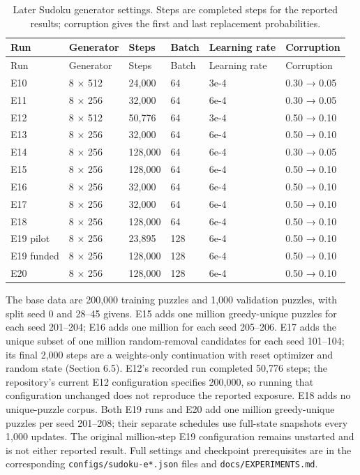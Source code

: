 \documentclass[
  british,
]{article}
\begin{document}
\begin{longtable}[]{@{}llllll@{}}
\caption{Later Sudoku generator settings. Steps are completed steps for
the reported results; corruption gives the first and last replacement
probabilities.}\tabularnewline
\toprule\noalign{}
Run & Generator & Steps & Batch & Learning rate & Corruption \\
\midrule\noalign{}
\endfirsthead
\toprule\noalign{}
Run & Generator & Steps & Batch & Learning rate & Corruption \\
\midrule\noalign{}
\endhead
\bottomrule\noalign{}
\endlastfoot
E10 & 8 × 512 & 24,000 & 64 & 3e-4 & 0.30 → 0.05 \\
E11 & 8 × 256 & 32,000 & 64 & 6e-4 & 0.30 → 0.05 \\
E12 & 8 × 512 & 50,776 & 64 & 3e-4 & 0.50 → 0.10 \\
E13 & 8 × 256 & 32,000 & 64 & 6e-4 & 0.50 → 0.10 \\
E14 & 8 × 256 & 128,000 & 64 & 6e-4 & 0.30 → 0.05 \\
E15 & 8 × 256 & 128,000 & 64 & 6e-4 & 0.50 → 0.10 \\
E16 & 8 × 256 & 32,000 & 64 & 6e-4 & 0.50 → 0.10 \\
E17 & 8 × 256 & 32,000 & 64 & 6e-4 & 0.50 → 0.10 \\
E18 & 8 × 256 & 128,000 & 64 & 6e-4 & 0.50 → 0.10 \\
E19 pilot & 8 × 256 & 23,895 & 128 & 6e-4 & 0.50 → 0.10 \\
E19 funded & 8 × 256 & 128,000 & 128 & 6e-4 & 0.50 → 0.10 \\
E20 & 8 × 256 & 128,000 & 128 & 6e-4 & 0.50 → 0.10 \\
\end{longtable}

The base data are 200,000 training puzzles and 1,000 validation puzzles,
with split seed 0 and 28--45 givens. E15 adds one million greedy-unique
puzzles for each seed 201--204; E16 adds one million for each seed
205--206. E17 adds the unique subset of one million random-removal
candidates for each seed 101--104; its final 2,000 steps are a
weights-only continuation with reset optimizer and random state (Section
6.5). E12's recorded run completed 50,776 steps; the repository's
current E12 configuration specifies 200,000, so running that
configuration unchanged does not reproduce the reported exposure. E18
adds no unique-puzzle corpus. Both E19 runs and E20 add one million
greedy-unique puzzles per seed 201--208; their separate schedules use
full-state snapshots every 1,000 updates. The original million-step E19
configuration remains unstarted and is not either reported result. Full
settings and checkpoint prerequisites are in the corresponding
\texttt{configs/sudoku-e*.json} files and \texttt{docs/EXPERIMENTS.md}.
\end{document}
